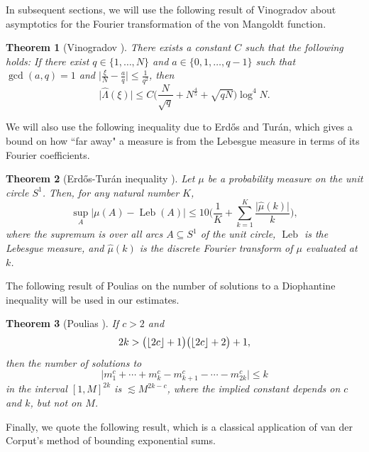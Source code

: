 \documentclass[letterpaper, 12pt]{article}
\theoremstyle{plain}
\newtheorem{Theorem}{Theorem}
\theoremstyle{definition}
\theoremstyle{plain}
\theoremstyle{plain}
\numberwithin{equation}{section}
\newcommand{\Erdos}{Erd\H{o}s}
\newcommand{\Turan}{Tur{\'a}n}
\renewcommand{\leq}{\leqslant}
\newcommand{\1}{\textbf{1}}
\DeclarePairedDelimiter\floor{\lfloor}{\rfloor}
\DeclareMathOperator{\Leb}{Leb}
\begin{document}
In subsequent sections, we will use the following result of Vinogradov about asymptotics for the Fourier transformation of the von Mangoldt function.

\begin{Theorem}[Vinogradov ]\label{thm:vinogradov}
    There exists a constant $C$ such that the following holds: If there exist $q \in \{1, \ldots, N\}$ and $a \in \{0, 1, \ldots, q - 1\}$ such that $\gcd(a,q) = 1$ and $\bigl\lvert \frac{\xi}{N} - \frac{a}{q} \bigr\rvert \leq \frac{1}{q^2}$, then
    \[
        \lvert \hat{\Lambda}(\xi) \rvert \leq C \biggl(\frac{N}{\sqrt{q}} + N^{\frac{4}{5}} + \sqrt{qN} \biggr) \log^4 N.
    \]
\end{Theorem}

We will also use the following inequality due to \Erdos{} and \Turan, which gives a bound on how ``far away" a measure is from the Lebesgue measure in terms of its Fourier coefficients.

\begin{Theorem}[\Erdos-\Turan{} inequality ]\label{thm:erdos-turan}
    Let $\mu$ be a probability measure on the unit circle \(S^1\). Then, for any natural number \(K\),
    \[
        \sup_{A} \lvert \mu (A) - \Leb(A)\rvert 
        \leq 10 \Biggl( \frac{1}{K} + \sum_{k=1}^{K} \frac{\bigl\lvert \hat{\mu} (k) \bigr\rvert}{k} \Biggr),
    \]
    where the supremum is over all arcs \(A \subseteq S^1\) of the unit circle, \(\Leb\) is the Lebesgue measure, and \(\hat{\mu}(k)\) is the discrete Fourier transform of $\mu$ evaluated at \(k\).
\end{Theorem}

The following result of Poulias on the number of solutions to a Diophantine inequality will be used in our estimates.

\begin{Theorem}[Poulias ]\label{thm:poulias}
    If $c > 2$ and 
    \[
        2k > \bigl(\floor{2c} + 1 \bigr) \bigl(\floor{2c} + 2 \bigr) + 1,
    \]
    then the number of solutions to 
    \[
        \lvert m_1^c + \cdots + m_k^c - m_{k + 1}^c - \cdots - m_{2k}^c \rvert \leq k
    \]
    in the interval $[1, M]^{2k}$ is $\lesssim M^{2k - c}$, where the implied constant depends on $c$ and $k$, but not on $M$. 
\end{Theorem}

Finally, we quote the following result, which is a classical application of van der Corput's method of bounding exponential sums.
\end{document}
